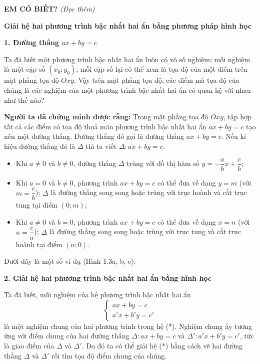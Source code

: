 \begin{lesson}
    \answerline
    \answerline
    \answerline

    \textbf{EM CÓ BIẾT?} \textit{(Đọc thêm)}

    \textbf{Giải hệ hai phương trình bậc nhất hai ẩn bằng phương pháp hình học}

    \textbf{1. Đường thẳng $ax+by=c$}

    Ta đã biết một phương trình bậc nhất hai ẩn luôn có vô số nghiệm; mỗi nghiệm là một cặp số $(x_0;y_0)$; mỗi cặp số lại có thể xem là tọa độ của một điểm trên mặt phẳng tọa độ $Oxy$. Vậy trên mặt phẳng tọa độ, các điểm mà tọa độ của chúng là các nghiệm của một phương trình bậc nhất hai ẩn có quan hệ với nhau như thế nào?

    \textbf{Người ta đã chứng minh được rằng:} Trong mặt phẳng tọa độ $Oxy$, tập hợp tất cả các điểm có tọa độ thoả mãn phương trình bậc nhất hai ẩn $ax+by=c$ tạo nên một đường thẳng. Đường thẳng đó gọi là đường thẳng $ax+by=c$. Nếu kí hiệu đường thẳng đó là $\Delta$ thì ta viết $\Delta: ax+by=c$.
    \begin{itemize}
        \item Khi $a\ne0$ và $b\ne0$, đường thẳng $\Delta$ trùng với đồ thị hàm số $y=-\dfrac{a}{b}x+\dfrac{c}{b}$;
        \item Khi $a=0$ và $b\ne0$, phương trình $ax+by=c$ có thể đưa về dạng $y=m$ (với $m=\dfrac{c}{b}$); $\Delta$ là đường thẳng song song hoặc trùng với trục hoành và cắt trục tung tại điểm $(0;m)$;
        \item Khi $a\ne0$ và $b=0$, phương trình $ax+by=c$ có thể đưa về dạng $x=n$ (với $n=\dfrac{c}{a}$); $\Delta$ là đường thẳng song song hoặc trùng với trục tung và cắt trục hoành tại điểm $(n;0)$.
    \end{itemize}

    Dưới đây là một số ví dụ (Hình 1.3a, b, c):


    \textbf{2. Giải hệ hai phương trình bậc nhất hai ẩn bằng hình học}

    Ta đã biết, mỗi nghiệm của hệ phương trình bậc nhất hai ẩn
    \[
        \begin{cases}
            ax+by=c\\
            a'x+b'y=c'
        \end{cases}
        \tag{*}
    \]
    là một nghiệm chung của hai phương trình trong hệ (*). Nghiệm chung ấy tương ứng với điểm chung của hai đường thẳng $\Delta: ax+by=c$ và $\Delta': a'x+b'y=c'$, tức là giao điểm của $\Delta$ và $\Delta'$. Do đó ta có thể giải hệ (*) bằng cách vẽ hai đường thẳng $\Delta$ và $\Delta'$ rồi tìm tọa độ điểm chung của chúng.


\end{lesson}

